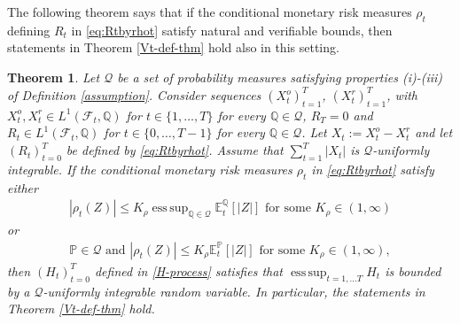 \documentclass[11pt,a4paper]{article}
\newtheorem{theorem}{Theorem}
\newcommand{\E}{\mathbb{E}}
\DeclareMathOperator*{\esssup}{ess\,sup}
\renewcommand{\P}{\mathbb{P}}
\newcommand{\Q}{\mathbb{Q}}
\newcommand{\calF}{\mathcal{F}}
\newcommand{\calQ}{\mathcal{Q}}
\begin{document}
The following theorem says that if the conditional monetary risk measures $\rho_t$ defining $R_t$ in \eqref{eq:Rtbyrhot} satisfy natural and verifiable bounds, then statements in Theorem \ref{Vt-def-thm} hold also in this setting. 

\begin{theorem}\label{thm:Vt-def-thm-specialised}
Let $\mathcal{Q}$ be a set of probability measures satisfying properties (i)-(iii) of Definition \ref{assumption}. 
Consider sequences $(X^{o}_t)_{t=1}^T$, $(X^{r}_t)_{t=1}^T$,  with $X^{o}_t,X^{r}_t\in L^{1}(\calF_t,\Q)$ for $t\in \{1,\dots,T\}$ for every $\Q\in\mathcal{Q}$, $R_T=0$ and $R_t\in L^{1}(\calF_t,\Q)$ for $t\in \{0,\dots,T-1\}$ for every $\Q\in\mathcal{Q}$. 
Let $X_t:=X^{o}_t-X^{r}_t$ and let $(R_t)_{t=0}^T$ be defined by \eqref{eq:Rtbyrhot}. Assume that $\sum_{t=1}^T|X_t|$ is $\calQ$-uniformly integrable. If the conditional monetary risk measures $\rho_t$ in \eqref{eq:Rtbyrhot} satisfy either 
\begin{align}\label{eq:risk_measure_bound}
|\rho_t(Z)|\leq K_{\rho}\esssup_{\Q\in\calQ}\E^{\Q}_t[|Z|]
\text{ for some } K_{\rho}\in (1,\infty)
\end{align}
or 
\begin{align}\label{eq:risk_measure_bound2}
\P \in \calQ \text{ and } 
|\rho_t(Z)|\leq K_{\rho}\E^{\P}_t[|Z|]
\text{ for some } K_{\rho}\in (1,\infty),
\end{align}
then $(H_t)_{t=0}^T$ defined in \eqref{H-process} satisfies that $\esssup_{t=1, \dots T} H_t$ is bounded by a $\calQ$-uniformly integrable random variable. In particular, the statements in Theorem \ref{Vt-def-thm} hold.  
\end{theorem}
\end{document}
